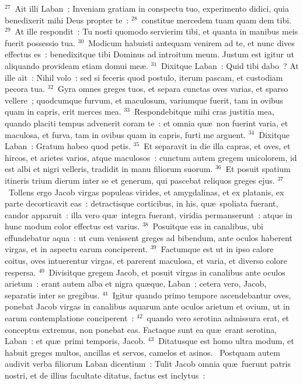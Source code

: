 ${}^{27}$~Ait illi Laban~: Inveniam gratiam in conspectu tuo, experimento didici, quia benedixerit mihi Deus propter te~:
${}^{28}$~constitue mercedem tuam quam dem tibi.
${}^{29}$~At ille respondit~: Tu nosti quomodo servierim tibi, et quanta in manibus meis fuerit possessio tua.
${}^{30}$~Modicum habuisti antequam venirem ad te, et nunc dives effectus es~: benedixitque tibi Dominus ad introitum meum. Justum est igitur ut aliquando provideam etiam domui me\ae .
${}^{31}$~Dixitque Laban~: Quid tibi dabo~? At ille ait~: Nihil volo~: sed si feceris quod postulo, iterum pascam, et custodiam pecora tua.
${}^{32}$~Gyra omnes greges tuos, et separa cunctas oves varias, et sparso vellere~; quodcumque furvum, et maculosum, variumque fuerit, tam in ovibus quam in capris, erit merces mea.
${}^{33}$~Respondebitque mihi cras justitia mea, quando placiti tempus advenerit coram te~: et omnia qu\ae\ non fuerint varia, et maculosa, et furva, tam in ovibus quam in capris, furti me arguent.
${}^{34}$~Dixitque Laban~: Gratum habeo quod petis.
${}^{35}$~Et separavit in die illa capras, et oves, et hircos, et arietes varios, atque maculosos~: cunctum autem gregem unicolorem, id est albi et nigri velleris, tradidit in manu filiorum suorum.
${}^{36}$~Et posuit spatium itineris trium dierum inter se et generum, qui pascebat reliquos greges ejus.
${}^{37}$~Tollens ergo Jacob virgas populeas virides, et amygdalinas, et ex platanis, ex parte decorticavit eas~: detractisque corticibus, in his, qu\ae\ spoliata fuerant, candor apparuit~: illa vero qu\ae\ integra fuerant, viridia permanserunt~: atque in hunc modum color effectus est varius.
${}^{38}$~Posuitque eas in canalibus, ubi effundebatur aqua~: ut cum venissent greges ad bibendum, ante oculos haberent virgas, et in aspectu earum conciperent.
${}^{39}$~Factumque est ut in ipso calore coitus, oves intuerentur virgas, et parerent maculosa, et varia, et diverso colore respersa.
${}^{40}$~Divisitque gregem Jacob, et posuit virgas in canalibus ante oculos arietum~: erant autem alba et nigra qu\ae que, Laban~; cetera vero, Jacob, separatis inter se gregibus.
${}^{41}$~Igitur quando primo tempore ascendebantur oves, ponebat Jacob virgas in canalibus aquarum ante oculos arietum et ovium, ut in earum contemplatione conciperent~:
${}^{42}$~quando vero serotina admissura erat, et conceptus extremus, non ponebat eas. Factaque sunt ea qu\ae\ erant serotina, Laban~: et qu\ae\ primi temporis, Jacob.
${}^{43}$~Ditatusque est homo ultra modum, et habuit greges multos, ancillas et servos, camelos et asinos.
~Postquam autem audivit verba filiorum Laban dicentium~: Tulit Jacob omnia qu\ae\ fuerunt patris nostri, et de illius facultate ditatus, factus est inclytus~:
